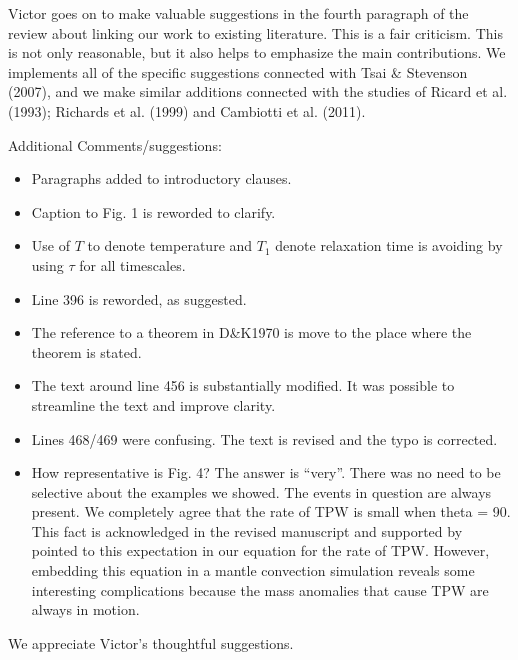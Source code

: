 \documentclass[a4paper,12pt]{article}
\begin{document}
Victor goes on to make valuable suggestions in the fourth paragraph of the review about linking our work to existing literature.
This is a fair criticism.
This is not only reasonable, but it also helps to emphasize the main contributions. We implements all of the specific suggestions connected with Tsai \& Stevenson (2007), and we make similar additions connected with the studies
of Ricard et al. (1993); Richards et al. (1999) and Cambiotti et al. (2011).

Additional Comments/suggestions:

\begin{itemize}

\item Paragraphs added to introductory clauses.

\item Caption to Fig. 1 is reworded to clarify.

\item Use of $T$ to denote temperature and $T_1$ denote relaxation time is avoiding by using $\tau$ for all timescales.

\item Line 396 is reworded, as suggested.

\item The reference to a theorem in D\&K1970 is move to the place where the theorem is stated.

\item The text around line 456 is substantially modified. It was possible to streamline the text and improve clarity.

\item Lines 468/469 were confusing. The text is revised and the typo is corrected.

\item How representative is Fig. 4? The answer is ``very''. There was no need to be selective about the examples we showed. The events in question are always present. We completely agree that the rate of TPW is small when theta = 90. This fact is acknowledged in the revised manuscript and supported by pointed to this expectation in our equation for the rate of TPW. However, embedding this equation in a mantle convection simulation reveals some interesting complications because the mass anomalies that cause TPW are always in motion.

\end{itemize}

We appreciate Victor's thoughtful suggestions.
\end{document}

